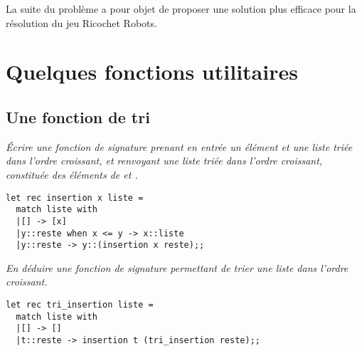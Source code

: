 \medskip

La suite du problème a pour objet de proposer une solution
plus efficace pour la résolution du jeu Ricochet Robots.
\section{Quelques fonctions utilitaires}
\subsection{Une fonction de tri}
\begin{Exercise}\it
Écrire une fonction  de signature  prenant en entrée un élément  et une liste 
triée dans l’ordre croissant, et renvoyant une liste triée dans l’ordre
croissant, constituée des éléments de  et .
\end{Exercise}
\begin{Answer}
\begin{lstlisting}
let rec insertion x liste = 
  match liste with
  |[] -> [x]
  |y::reste when x <= y -> x::liste
  |y::reste -> y::(insertion x reste);;
\end{lstlisting}
\newpage
\end{Answer}
\begin{Exercise}\it
En déduire une fonction  de signature  permettant de trier une liste dans l’ordre croissant.
\end{Exercise}
\begin{Answer}
\begin{lstlisting}
let rec tri_insertion liste = 
  match liste with
  |[] -> []
  |t::reste -> insertion t (tri_insertion reste);;
\end{lstlisting}
\end{Answer}
